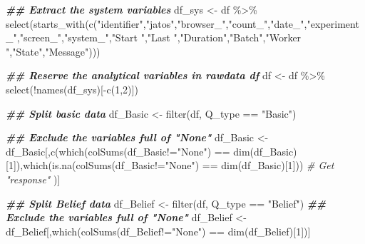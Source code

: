 \documentclass[
]{article}
\newenvironment{Shaded}{\begin{snugshade}}{\end{snugshade}}
\newcommand{\CommentTok}[1]{\textcolor[rgb]{0.56,0.35,0.01}{\textit{#1}}}
\newcommand{\DecValTok}[1]{\textcolor[rgb]{0.00,0.00,0.81}{#1}}
\newcommand{\DocumentationTok}[1]{\textcolor[rgb]{0.56,0.35,0.01}{\textbf{\textit{#1}}}}
\newcommand{\FunctionTok}[1]{\textcolor[rgb]{0.00,0.00,0.00}{#1}}
\newcommand{\NormalTok}[1]{#1}
\newcommand{\OtherTok}[1]{\textcolor[rgb]{0.56,0.35,0.01}{#1}}
\newcommand{\SpecialCharTok}[1]{\textcolor[rgb]{0.00,0.00,0.00}{#1}}
\newcommand{\StringTok}[1]{\textcolor[rgb]{0.31,0.60,0.02}{#1}}
\begin{document}
\begin{Shaded}
\begin{Highlighting}[]
\DocumentationTok{\#\# Extract the system variables}
\NormalTok{df\_sys }\OtherTok{\textless{}{-}}\NormalTok{ df }\SpecialCharTok{\%\textgreater{}\%} \FunctionTok{select}\NormalTok{(}\FunctionTok{starts\_with}\NormalTok{(}\FunctionTok{c}\NormalTok{(}\StringTok{"identifier"}\NormalTok{,}\StringTok{"jatos"}\NormalTok{,}\StringTok{"browser\_"}\NormalTok{,}\StringTok{"count\_"}\NormalTok{,}\StringTok{"date\_"}\NormalTok{,}\StringTok{"experiment\_"}\NormalTok{,}\StringTok{"screen\_"}\NormalTok{,}\StringTok{"system\_"}\NormalTok{,}\StringTok{"Start "}\NormalTok{,}\StringTok{"Last "}\NormalTok{,}\StringTok{"Duration"}\NormalTok{,}\StringTok{"Batch"}\NormalTok{,}\StringTok{"Worker "}\NormalTok{,}\StringTok{"State"}\NormalTok{,}\StringTok{"Message"}\NormalTok{)))}

\DocumentationTok{\#\# Reserve the analytical variables in rawdata df}
\NormalTok{df }\OtherTok{\textless{}{-}}\NormalTok{ df }\SpecialCharTok{\%\textgreater{}\%} \FunctionTok{select}\NormalTok{(}\SpecialCharTok{!}\FunctionTok{names}\NormalTok{(df\_sys)[}\SpecialCharTok{{-}}\FunctionTok{c}\NormalTok{(}\DecValTok{1}\NormalTok{,}\DecValTok{2}\NormalTok{)])}

\DocumentationTok{\#\# Split basic data}
\NormalTok{df\_Basic }\OtherTok{\textless{}{-}} \FunctionTok{filter}\NormalTok{(df, Q\_type }\SpecialCharTok{==} \StringTok{"Basic"}\NormalTok{)}

\DocumentationTok{\#\# Exclude the variables full of "None"}
\NormalTok{df\_Basic }\OtherTok{\textless{}{-}}\NormalTok{ df\_Basic[,}\FunctionTok{c}\NormalTok{(}\FunctionTok{which}\NormalTok{(}\FunctionTok{colSums}\NormalTok{(df\_Basic}\SpecialCharTok{!=}\StringTok{"None"}\NormalTok{) }\SpecialCharTok{==} \FunctionTok{dim}\NormalTok{(df\_Basic)[}\DecValTok{1}\NormalTok{]),}\FunctionTok{which}\NormalTok{(}\FunctionTok{is.na}\NormalTok{(}\FunctionTok{colSums}\NormalTok{(df\_Basic}\SpecialCharTok{!=}\StringTok{"None"}\NormalTok{) }\SpecialCharTok{==} \FunctionTok{dim}\NormalTok{(df\_Basic)[}\DecValTok{1}\NormalTok{])) }\CommentTok{\# Get "response"}
\NormalTok{)]}

\DocumentationTok{\#\# Split Belief data}
\NormalTok{df\_Belief }\OtherTok{\textless{}{-}} \FunctionTok{filter}\NormalTok{(df, Q\_type }\SpecialCharTok{==} \StringTok{"Belief"}\NormalTok{)}
\DocumentationTok{\#\# Exclude the variables full of "None"}
\NormalTok{df\_Belief }\OtherTok{\textless{}{-}}\NormalTok{ df\_Belief[,}\FunctionTok{which}\NormalTok{(}\FunctionTok{colSums}\NormalTok{(df\_Belief}\SpecialCharTok{!=}\StringTok{"None"}\NormalTok{) }\SpecialCharTok{==} \FunctionTok{dim}\NormalTok{(df\_Belief)[}\DecValTok{1}\NormalTok{])]}



\end{Highlighting}
\end{Shaded}
\end{document}
